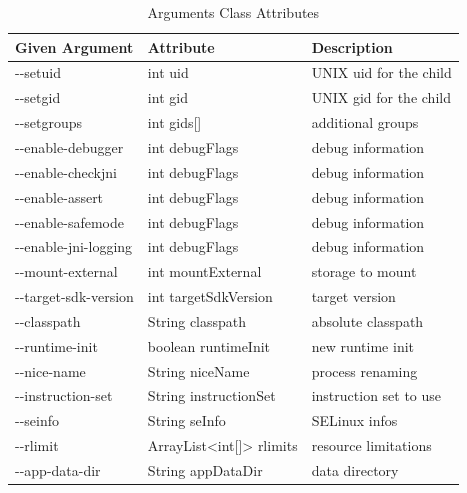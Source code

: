 \begin{table}[htb]
  \caption[Arguments Class Attributes]{Arguments Class Attributes}
  \label{tab:argument_class_attributes}
  \begin{tabular}{l l l}
    \toprule
     Given Argument & Attribute & Description \\
     \midrule
     -{}-setuid & int uid & UNIX uid for the child \\
     -{}-setgid & int gid & UNIX gid for the child \\
     -{}-setgroups & int gids[] & additional groups \\
     -{}-enable-debugger & int debugFlags & debug information \\
     -{}-enable-checkjni & int debugFlags & debug information \\
     -{}-enable-assert & int debugFlags & debug information \\
     -{}-enable-safemode & int debugFlags & debug information \\
     -{}-enable-jni-logging & int debugFlags & debug information \\
     -{}-mount-external & int mountExternal & storage to mount \\
     -{}-target-sdk-version & int targetSdkVersion & target version \\
     -{}-classpath & String classpath & absolute classpath \\
     -{}-runtime-init & boolean runtimeInit & new runtime init \\
     -{}-nice-name & String niceName & process renaming \\
     -{}-instruction-set & String instructionSet & instruction set to use \\
     -{}-seinfo & String seInfo & SELinux infos  \\
     -{}-rlimit & ArrayList<int[]> rlimits & resource limitations \\
     -{}-app-data-dir & String appDataDir & data directory \\
      \bottomrule
  \end{tabular}
\end{table}

